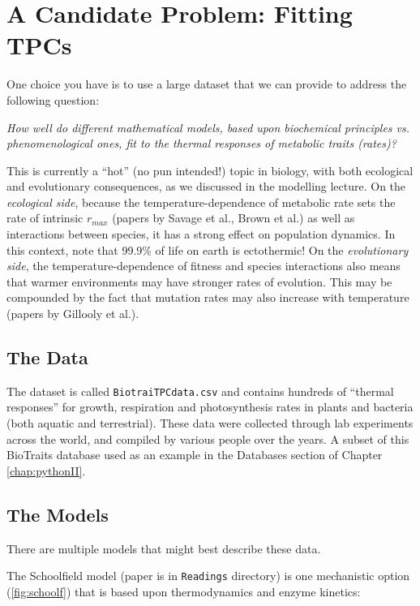 \section {A Candidate Problem: Fitting TPCs}

One choice you have is to use a large dataset that we can provide to 
address the following question: 

{\it How well do different mathematical models, based upon biochemical 
principles vs. phenomenological ones, fit to the thermal responses of 
metabolic traits (rates)?}

This is currently a ``hot'' (no pun intended!) topic in biology, with 
both ecological and evolutionary consequences, as we discussed in the 
modelling lecture. On the {\it ecological side}, because the 
temperature-dependence of metabolic rate sets the rate of intrinsic 
$r_{max}$ (papers by Savage et al., Brown et al.) as well as 
interactions between species, it has a strong effect on population 
dynamics. In this context, note that 99.9\% of life on earth is 
ectothermic! On the {\it evolutionary side}, the temperature-dependence 
of fitness and species interactions also means that warmer environments 
may have stronger rates of evolution. This may be compounded by the 
fact that mutation rates may also increase with temperature (papers by 
Gillooly et al.).

\subsection{The Data}

The dataset is called {\tt BiotraiTPCdata.csv} and contains hundreds of 
``thermal responses'' for growth, respiration and photosynthesis rates 
in plants and bacteria (both aquatic and terrestrial). These data were 
collected through lab experiments across the world, and compiled by 
various people over the years. A subset of this BioTraits database used 
as an example in the Databases section of Chapter \ref{chap:pythonII}.

\subsection {The Models}

There are multiple models that might best describe these data.

The Schoolfield model (paper is in {\tt Readings} directory) is one
mechanistic option (\ref{fig:schoolf}) that is based upon 
thermodynamics and enzyme kinetics:

